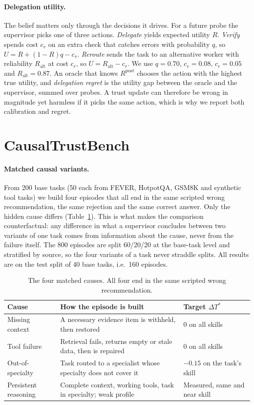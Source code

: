 \documentclass[letterpaper]{article}
\newcommand{\dTs}{\Delta T^{*}}
\begin{document}
\paragraph{Delegation utility.} The belief matters only through the decisions it drives. For a future probe the supervisor picks one of three actions. \emph{Delegate} yields expected utility $R$. \emph{Verify} spends cost $c_v$ on an extra check that catches errors with probability $q$, so $U=R+(1-R)q-c_v$. \emph{Reroute} sends the task to an alternative worker with reliability $R_{\text{alt}}$ at cost $c_r$, so $U=R_{\text{alt}}-c_r$. We use $q=0.70$, $c_v=0.08$, $c_r=0.05$ and $R_{\text{alt}}=0.87$. An oracle that knows $R^{\text{post}}$ chooses the action with the highest true utility, and \emph{delegation regret} is the utility gap between the oracle and the supervisor, summed over probes. A trust update can therefore be wrong in magnitude yet harmless if it picks the same action, which is why we report both calibration and regret.

\section{CausalTrustBench}
\paragraph{Matched causal variants.}
From 200 base tasks (50 each from FEVER, HotpotQA, GSM8K and synthetic tool tasks) we build four episodes that all end in the same scripted wrong recommendation, the same rejection and the same correct answer. Only the hidden cause differs (Table~\ref{tab:causes}). This is what makes the comparison counterfactual: any difference in what a supervisor concludes between two variants of one task comes from information about the cause, never from the failure itself. The 800 episodes are split 60/20/20 at the base-task level and stratified by source, so the four variants of a task never straddle splits. All results are on the test split of 40 base tasks, i.e.\ 160 episodes.

\begin{table}[t]
\centering\scriptsize
\setlength{\tabcolsep}{3pt}
\begin{tabular}{p{1.55cm}p{3.35cm}p{2.2cm}}
\toprule
Cause & How the episode is built & Target $\dTs$\\
\midrule
Missing context & A necessary evidence item is withheld, then restored & $0$ on all skills\\
Tool failure & Retrieval fails, returns empty or stale data, then is repaired & $0$ on all skills\\
Out-of-specialty & Task routed to a specialist whose specialty does not cover it & $-0.15$ on the task's skill\\
Persistent reasoning & Complete context, working tools, task in specialty; weak profile & Measured, same and near skill\\
\bottomrule
\end{tabular}
\caption{The four matched causes. All four end in the same scripted wrong recommendation.}
\label{tab:causes}
\end{table}
\end{document}

